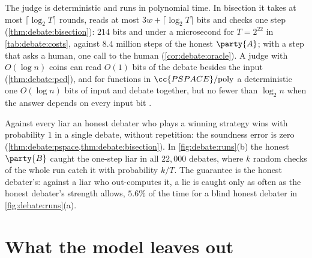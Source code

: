 \begin{refsection}
\questiontwo The judge is deterministic and runs in polynomial time. In bisection it takes at most $\lceil\log_2T\rceil$ rounds, reads at most $3w+\lceil\log_2T\rceil$ bits and checks one step (\cref{thm:debate:bisection}): $214$ bits and under a microsecond for $T=2^{22}$ in \cref{tab:debate:costs}, against $8.4$ million steps of the honest $\party{A}$; with a step that asks a human, one call to the human (\cref{cor:debate:oracle}). A judge with $O(\log n)$ coins can read $O(1)$ bits of the debate besides the input (\cref{thm:debate:pcd}), and for functions in $\cc{PSPACE}/\mathrm{poly}$ a deterministic one $O(\log n)$ bits of input and debate together, but no fewer than $\log_2n$ when the answer depends on every input bit \parencite{BrownCohenEtAl2026Query}.

\questionthree Against every liar an honest debater who plays a winning strategy wins with probability $1$ in a single debate, without repetition: the soundness error is zero (\cref{thm:debate:pspace,thm:debate:bisection}). In \cref{fig:debate:runs}(b) the honest $\party{B}$ caught the one-step liar in all $22{,}000$ debates, where $k$ random checks of the whole run catch it with probability $k/T$. The guarantee is the honest debater's: against a liar who out-computes it, a lie is caught only as often as the honest debater's strength allows, $5.6\%$ of the time for a blind honest debater in \cref{fig:debate:runs}(a).


\section{What the model leaves out}\label{sec:debate:leaves}


\end{refsection}
